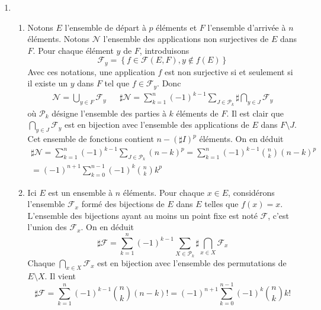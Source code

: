 \begin{enumerate}
\item \begin{enumerate}
\item Notons $E$ l'ensemble de départ à $p$ éléments et $F$ l'ensemble d'arrivée à $n$ éléments. Notons $\mathcal N$ l'ensemble des applications non surjectives de $E$ dans $F$. Pour chaque élément $y$ de $F$, introduisons
\begin{displaymath}
 \mathcal F_y =\left\lbrace f\in\mathcal F(E,F) , y\notin f(E) \right\rbrace 
\end{displaymath}
Avec ces notations, une application $f$ est non surjective si et seulement si il existe un $y$ dans $F$ tel que $f\in \mathcal F_y$. Donc
\begin{align*}
 \mathcal N = \bigcup_{y\in F}\mathcal F_y & &
\sharp \mathcal N = \sum_{k=1}^n(-1)^{k-1}\sum _{J\in \mathcal{P}_k}\sharp \bigcap_{y\in J} \mathcal F_y
\end{align*}
où $\mathcal{P}_k$ désigne l'ensemble des parties à $k$ éléments de $F$. Il est clair que $\bigcap_{y\in J} \mathcal F_y$ est en bijection avec l'ensemble des applications de $E$ dans $F\setminus J$. Cet ensemble de fonctions contient $n-(\sharp I)^p$ éléments. On en déduit
\begin{multline*}
 \sharp \mathcal N =
\sum_{k=1}^n(-1)^{k-1}\sum _{J\in \mathcal{P}_k}(n-k)^p
= \sum_{k=1}^n(-1)^{k-1}\binom{n}{k}(n-k)^p\\
= (-1)^{n+1}\sum_{k=0}^{n-1}(-1)^{k}\binom{n}{k}k^p
\end{multline*}

\item Ici $E$ est un ensemble à $n$ éléments. Pour chaque $x\in E$, considérons l'ensemble $\mathcal F_x$ formé des bijections de $E$ dans $E$ telles que $f(x)=x$. L'ensemble des bijections ayant au moins un point fixe est noté $\mathcal F$, c'est l'union des $\mathcal F_x$. On en déduit
\begin{displaymath}
\sharp \mathcal F = \sum_{k=1}^n(-1)^{k-1}\sum _{X\in \mathcal{P}_k}\sharp \bigcap_{x\in X} \mathcal F_x
\end{displaymath}
  Chaque $\bigcap_{x\in X} \mathcal F_x$ est en bijection avec l'ensemble des permutations de $E\setminus X$. Il vient 
\begin{displaymath}
\sharp \mathcal F 
= \sum_{k=1}^n(-1)^{k-1}\binom{n}{k}(n-k)!
= (-1)^{n+1}\sum_{k=0}^{n-1}(-1)^{k}\binom{n}{k}k!
\end{displaymath}

\end{enumerate}

\end{enumerate}